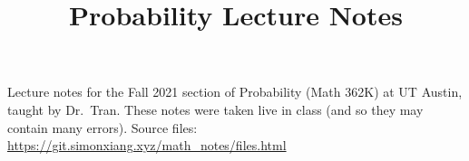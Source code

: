 \documentclass[fontsize=9pt]{article}
\title{Probability Lecture Notes}
\date{}
\begin{document}
\maketitle
Lecture notes for the Fall 2021 section of Probability (Math 362K) at UT Austin, taught by Dr.\ Tran. These notes were taken live in class (and so they may contain many errors). Source files: \url{https://git.simonxiang.xyz/math_notes/files.html}

\tableofcontents
\newpage
    
\end{document}
